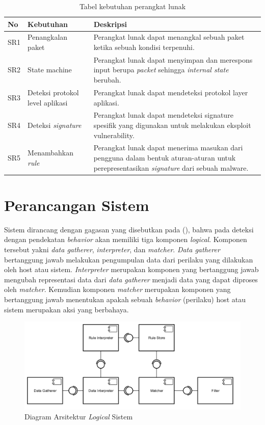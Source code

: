 \begin{table}[H]
	\caption{Tabel kebutuhan perangkat lunak}
	\label{table:software_requirement}
	\begin{tabularx}{\textwidth}{|l|X|X|}
		\hline
		\textbf{No} & \textbf{Kebutuhan} & \textbf{Deskripsi} \\ \hline
		SR1 & Penangkalan paket & Perangkat lunak dapat menangkal sebuah paket ketika sebuah kondisi terpenuhi. \\ \hline 
		SR2 & State machine & Perangkat lunak dapat menyimpan dan merespons input berupa \textit{packet} sehingga \textit{internal state} berubah. \\ \hline
		SR3 & Deteksi protokol level aplikasi & Perangkat lunak dapat mendeteksi protokol layer aplikasi. \\ \hline
		SR4 & Deteksi \textit{signature} & Perangkat lunak dapat mendeteksi signature spesifik yang digunakan untuk melakukan eksploit vulnerability.\\ \hline
		SR5 & Menambahkan \textit{rule} & Perangkat lunak dapat menerima masukan dari pengguna dalam bentuk aturan-aturan untuk perepresentasikan \textit{signature} dari sebuah malware.\\ \hline
	\end{tabularx}
\end{table}

\section{Perancangan Sistem}

Sistem dirancang dengan gagasan yang disebutkan pada (\cite{6620049}), bahwa pada deteksi dengan pendekatan \textit{behavior} akan memiliki tiga komponen \textit{logical}. Komponen tersebut yakni \textit{data gatherer}, \textit{interpreter}, dan \textit{matcher}. \textit{Data gatherer} bertanggung jawab melakukan pengumpulan data dari perilaku yang dilakukan oleh host atau sistem. \textit{Interpreter} merupakan komponen yang bertanggung jawab mengubah representasi data dari \textit{data gatherer} menjadi data yang dapat diproses oleh \textit{matcher}. Kemudian komponen \textit{matcher} merupakan komponen yang bertanggung jawab menentukan apakah sebuah \textit{behavior} (perilaku) host atau sistem merupakan aksi yang berbahaya.

\begin{figure}[H]
	\centering
	\includegraphics[width=\textwidth]{resources/behavior_based_architecture.png}
	\caption{Diagram Arsitektur \textit{Logical} Sistem}
	\label{fig:architecture_diagram}
\end{figure}

